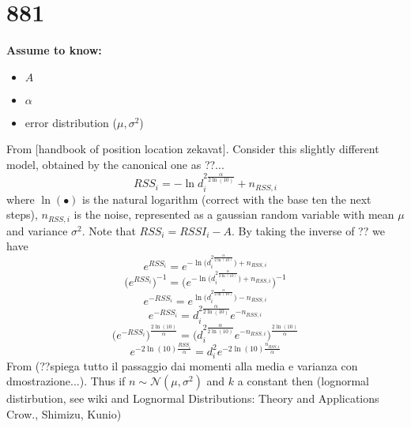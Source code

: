 \documentclass[12pt]{report}
\begin{document}
\section{881}
  \begin{center}
  \textbf{Assume to know:}
  \begin{itemize}
    \centering
    \item $A$
    \item $\alpha$
    \item error distribution ($\mu, \sigma^2$)
  \end{itemize}
  \end{center}
From [handbook of position location zekavat]. Consider this slightly different model, obtained by the canonical one as ??...
\begin{equation}
    RSS_i=-\ln{d_i^{2\frac{\alpha}{2\ln(10)}}}+n_{RSS,i}
\end{equation}
where $\ln(\bullet)$ is the natural logarithm (correct with the base ten the next steps), $n_{RSS,i}$ is the noise, represented as a gaussian random variable with mean $\mu$ and variance $\sigma^2$. Note that $RSS_i=RSSI_i-A$. By taking the inverse of ?? we have 
\begin{equation}
    e^{RSS_i}=e^{-\ln\big(d_i^{2\frac{\alpha}{2\ln(10)}}\big)+n_{RSS,i}}
\end{equation}
\begin{equation}
    \bigg(e^{RSS_i}\bigg)^{-1}=\bigg(e^{-\ln\big(d_i^{2\frac{\alpha}{2\ln(10)}}\big)+n_{RSS,i}}\bigg)^{-1}
\end{equation}
\begin{equation}
    e^{-RSS_i}=e^{\ln\big(d_i^{2\frac{\alpha}{2\ln(10)}}\big)-n_{RSS,i}}
\end{equation}
\begin{equation}
    e^{-RSS_i}=d_i^{2\frac{\alpha}{2\ln(10)}}e^{-n_{RSS,i}}
\end{equation}
\begin{equation}
    \bigg(e^{-RSS_i}\bigg)^{\frac{2\ln(10)}{\alpha}}=\bigg(d_i^{2\frac{\alpha}{2\ln(10)}}e^{-n_{RSS,i}}\bigg)^{\frac{2\ln(10)}{\alpha}}
\end{equation}
\begin{equation}
    e^{-2\ln(10)\frac{RSS_i}{\alpha}}=d_i^2e^{-2\ln(10)\frac{n_{RSS,i}}{\alpha}}
\end{equation}
From \cite{Beran2011} (??spiega tutto il passaggio dai momenti alla media e varianza con dmostrazione...).  Thus if $n\sim\mathcal{N}(\mu,\sigma^2)$ and $k$ a constant then (lognormal distirbution, see wiki and Lognormal Distributions: Theory and Applications Crow., Shimizu, Kunio)
\end{document}
